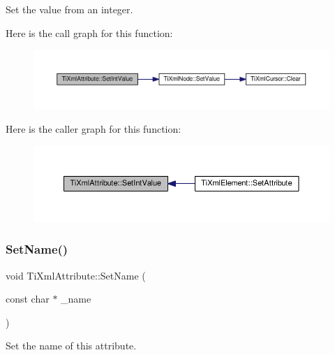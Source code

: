 Set the value from an integer. 

Here is the call graph for this function\+:\nopagebreak
\begin{figure}[H]
\begin{center}
\leavevmode
\includegraphics[width=350pt]{class_ti_xml_attribute_a7e065df640116a62ea4f4b7da5449cc8_cgraph}
\end{center}
\end{figure}
Here is the caller graph for this function\+:\nopagebreak
\begin{figure}[H]
\begin{center}
\leavevmode
\includegraphics[width=350pt]{class_ti_xml_attribute_a7e065df640116a62ea4f4b7da5449cc8_icgraph}
\end{center}
\end{figure}
\mbox{\label{class_ti_xml_attribute_ab7fa3d21ff8d7c5764cf9af15b667a99}} 
\subsubsection{\texorpdfstring{Set\+Name()}{SetName()}}
{\footnotesize\ttfamily void Ti\+Xml\+Attribute\+::\+Set\+Name (\begin{DoxyParamCaption}\item[{const char $\ast$}]{\+\_\+name }\end{DoxyParamCaption})\hspace{0.3cm}{\ttfamily [inline]}}



Set the name of this attribute. 


